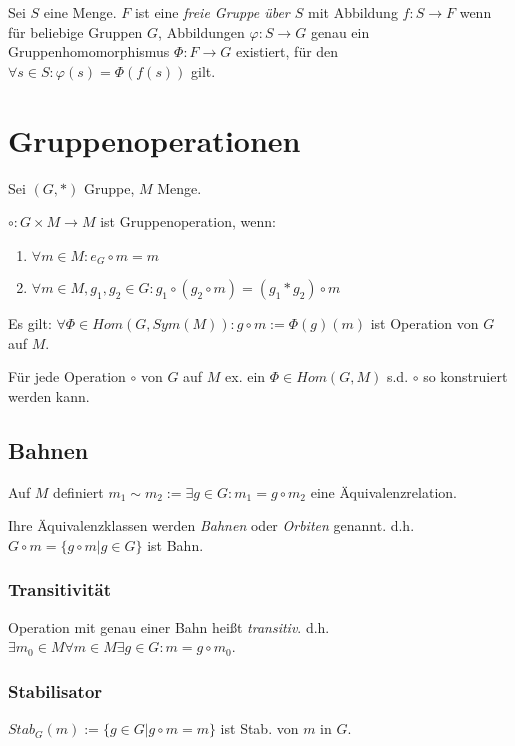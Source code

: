 Sei $S$ eine Menge. $F$ ist eine \emph{freie Gruppe über $S$} mit Abbildung $f : S \rightarrow F$ wenn für beliebige Gruppen $G$, Abbildungen $\varphi : S \rightarrow G$ genau ein Gruppenhomomorphismus $\Phi : F \rightarrow G$ existiert, für den $\forall s \in S : \varphi(s) = \Phi(f(s))$ gilt.

\section*{Gruppenoperationen}

Sei $(G,*)$ Gruppe, $M$ Menge.

$\circ : G \times M \rightarrow M$ ist Gruppenoperation, wenn:

\begin{enumerate}[label=(\alph*)]
	\item $\forall m \in M : e_G \circ m = m$
	\item $\forall m \in M, g_1, g_2 \in G : g_1 \circ ( g_2 \circ m ) = ( g_1 * g_2 ) \circ m$
\end{enumerate}

Es gilt: $\forall \Phi \in Hom(G,Sym(M)) : g \circ m := \Phi(g)(m)$ ist Operation von $G$ auf $M$.

Für jede Operation $\circ$ von $G$ auf $M$ ex. ein $\Phi \in Hom(G,M)$ s.d. $\circ$ so konstruiert werden kann.

\subsection*{Bahnen}

Auf $M$ definiert $m_1 \sim m_2 := \exists g \in G : m_1 = g \circ m_2$ eine Äquivalenzrelation.

Ihre Äquivalenzklassen werden \emph{Bahnen} oder \emph{Orbiten} genannt. d.h. $G \circ m = \{ g \circ m | g \in G \}$ ist Bahn.

\subsubsection*{Transitivität}

Operation mit genau einer Bahn heißt \emph{transitiv}. d.h. $\exists m_0 \in M \forall m \in M \exists g \in G : m = g \circ m_0$.

\subsubsection*{Stabilisator}

$Stab_G(m) := \{ g \in G | g \circ m = m \}$ ist Stab. von $m$ in $G$.

